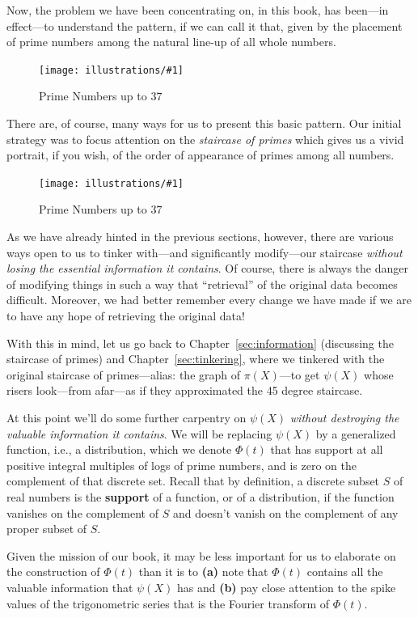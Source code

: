\documentclass[openany]{book}
\newcommand{\ill}[3]{%
   \begin{figure}[H]%
   \vspace{-2ex}
   \centering%
   \texttt{[image: illustrations/\#1]}%
   \caption{#3}%
   \vspace{-2ex}
    \end{figure}}
\theoremstyle{plain}
\theoremstyle{definition}
\begin{document}
{{  Now, the problem we have been concentrating on, in this book, has
  been---in effect---to understand the pattern, if we can call it
  that, given by the placement of prime numbers among the natural
  line-up of all whole numbers.
\ill{primes_line}{1}{Prime Numbers up to $37$}

 There are, of course, many ways for us to present this basic
 pattern. Our initial strategy was to focus attention on the {\it
   staircase of primes} which gives us a vivid portrait, if you wish,
 of the order of appearance of primes among all numbers.
\ill{PN_38}{.45}{Prime Numbers up to $37$}

 As we have already hinted in the previous sections, however, there
 are various ways open to us to tinker with---and significantly
 modify---our staircase {\it without losing the essential information
   it contains}. Of course, there is always the danger of modifying
 things in such a way that ``retrieval'' of the original data becomes
 difficult.  Moreover, we had better remember every change we have
 made if we are to have any hope of retrieving the original data!

 With this in mind, let us go back to Chapter~\ref{sec:information}
 (discussing the staircase of primes) and Chapter~\ref{sec:tinkering},
 where we tinkered with the original staircase of primes---alias: the
 graph of $\pi(X)$---to get $\psi(X)$ whose risers look---from
 afar---as if they approximated the 45 degree staircase.%


   At this point we'll do some further carpentry on $\psi(X)$ {\it without destroying the valuable
   information it contains}. We will be replacing  $\psi(X)$ by a generalized function, i.e., a
   distribution, which we denote $\Phi(t)$ that has support at all positive integral multiples
     of logs of prime numbers, and is  zero on the complement of that discrete set.  Recall that
     by definition, a discrete subset $S$ of real numbers is  the  {\bf support} of a function,
     or of a distribution, if the function vanishes on the complement of  $S$ and doesn't vanish
     on the complement of any proper subset of $S$.

   Given the mission of our book, it may be less important for us to  elaborate on  the construction
   of  $\Phi(t)$  than it is to {\bf (a)} note that $\Phi(t)$  contains all the valuable information
   that  $\psi(X)$ has and {\bf (b)} pay close attention to the spike values of the trigonometric
   series that is the Fourier transform of $\Phi(t)$.

}}
\end{document}
